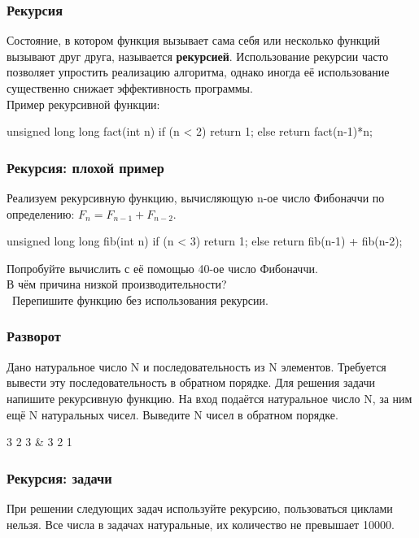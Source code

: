 \begin{frame}[fragile]
	\frametitle{Рекурсия}
	Состояние, в котором функция вызывает сама себя или несколько функций вызывают
	друг друга, называется {\bf рекурсией}. Использование рекурсии часто позволяет
	упростить реализацию алгоритма, однако иногда её использование существенно
	снижает эффективность программы. \\

	Пример рекурсивной функции:
	\begin{code}
unsigned long long fact(int n)
{
	if (n < 2)
		return 1;
	else
		return fact(n-1)*n;
}
	\end{code}
\end{frame}

\begin{frame}[fragile]
	\frametitle{Рекурсия: плохой пример}
	Реализуем рекурсивную функцию, вычисляющую n-ое число Фибоначчи по
	определению: $F_n = F_{n-1} + F_{n-2}$.

	\begin{code}
unsigned long long fib(int n)
{
	if (n < 3)
		return 1;
	else
		return fib(n-1) + fib(n-2);
}
	\end{code}
	Попробуйте вычислить с её помощью 40-ое число Фибоначчи. \\
	В чём причина низкой производительности? \\

	\bigqm \, Перепишите функцию без использования рекурсии.

\end{frame}

\begin{frame}
	\frametitle{Разворот}
	Дано натуральное число N и последовательность из N элементов. Требуется
	вывести эту последовательность в обратном порядке. Для решения задачи напишите
	рекурсивную функцию.
	\inp
	На вход подаётся натуральное число N, за ним ещё N натуральных чисел.
	\out
	Выведите N чисел в обратном порядке.
	\begin{ex}
		3  2 3 & 3 2 1\tb
	\end{ex}
\end{frame}

\begin{frame}
	\frametitle{Рекурсия: задачи}
	При решении следующих задач используйте рекурсию, пользоваться циклами нельзя.
	Все числа в задачах натуральные, их количество не превышает 10000.
	\\

\end{frame}

